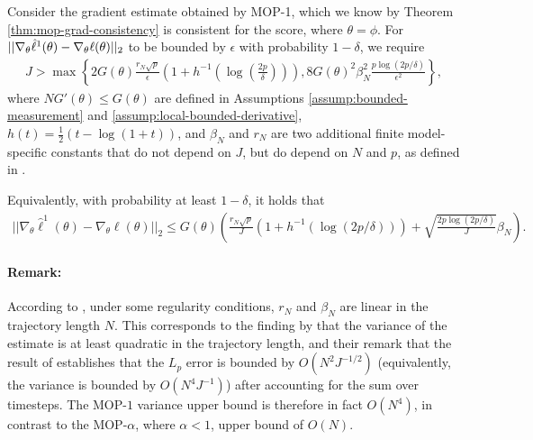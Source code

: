\begin{lem}
    \label{lemma:grad_bound}
    Consider the gradient estimate obtained by MOP-1, which we know by Theorem \ref{thm:mop-grad-consistency} is consistent for the score, where $\theta = \phi$. For $||\nabla_\theta \hat{\ell}^1(\theta) - \nabla_\theta \ell(\theta)||_2$ to be bounded by $\epsilon$ with probability $1-\delta$, we require
    \begin{align}
    J > \max\left\{2G(\theta)\frac{r_N\sqrt{p}}{\epsilon}\left(1+h^{-1}\left(\log\left(\frac{2p}{\delta}\right)\right)\right), 8G(\theta)^2\beta_N^2\frac{p\log(2p/\delta)}{\epsilon^2}\right\},
    \end{align}
    where $NG'(\theta) \leq G(\theta)$ are defined in Assumptions \ref{assump:bounded-measurement} and \ref{assump:local-bounded-derivative}, $h(t) = \frac{1}{2}(t - \log(1+t))$, and $\beta_N$ and $r_N$ are two additional finite model-specific constants that do not depend on $J$, but do depend on $N$ and $p$, as defined in \cite{delMoral11}. 

    Equivalently, with probability at least $1-\delta$, it holds that
    \begin{align}
        ||\nabla_\theta \hat\ell^1(\theta) - \nabla_\theta \ell(\theta)||_2 \leq G(\theta)\left(\frac{r_N\sqrt{p}}{J}(1+h^{-1}(\log(2p/\delta))) + \sqrt{\frac{2p\log(2p/\delta)}{J}}\beta_N\right).
    \end{align}
\end{lem}

\paragraph{Remark:} According to \cite{delMoral11}, under some regularity conditions, $r_N$ and $\beta_N$ are linear in the trajectory length $N$. This corresponds to the finding by \cite{poyiadjis11} that the variance of the estimate is at least quadratic in the trajectory length, and their remark that the result of \cite{delMoral03} establishes that the $L_p$ error is bounded by $O(N^2J^{-1/2})$ (equivalently, the variance is bounded by $O(N^4J^{-1})$) after accounting for the sum over timesteps. The MOP-$1$ variance upper bound is therefore in fact $O(N^4)$, in contrast to the MOP-$\alpha$, where $\alpha<1$, upper bound of $O(N)$. 



